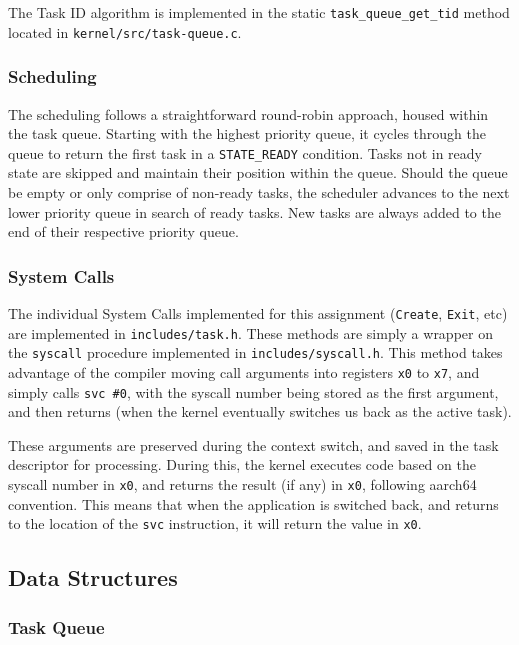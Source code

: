 \documentclass[12pt]{article}
\begin{document}
    The Task ID algorithm is implemented in the static \verb`task_queue_get_tid` method located in \verb`kernel/src/task-queue.c`.
    
    \subsubsection{Scheduling}
    \label{sec:scheduling}

    The scheduling follows a straightforward round-robin approach, housed within the task queue.
    Starting with the highest priority queue, it cycles through the queue to return the first task in a \verb`STATE_READY` condition. 
    Tasks not in ready state are skipped and maintain their position within the queue. 
    Should the queue be empty or only comprise of non-ready tasks, the scheduler advances to the next lower priority queue in search of ready tasks.
    New tasks are always added to the end of their respective priority queue. 
    
    \subsubsection{System Calls}
    \label{sec:sys-calls}
    
    The individual System Calls implemented for this assignment (\verb`Create`, \verb`Exit`, etc) are implemented in \verb`includes/task.h`. These methods are simply a wrapper on the \verb`syscall` procedure implemented in \verb`includes/syscall.h`. This method takes advantage of the compiler moving call arguments into registers \verb`x0` to \verb`x7`, and simply calls \verb`svc #0`, with the syscall number being stored as the first argument, and then returns (when the kernel eventually switches us back as the active task). 
    
    These arguments are preserved during the context switch, and saved in the task descriptor for processing. During this, the kernel executes code based on the syscall number in \verb`x0`, and returns the result (if any) in \verb`x0`, following aarch64 convention. This means that when the application is switched back, and returns to the location of the \verb`svc` instruction, it will return the value in \verb`x0`.
    
    \subsection{Data Structures}
    
    \subsubsection{Task Queue}
    \label{sec:task-queue}
\end{document}
